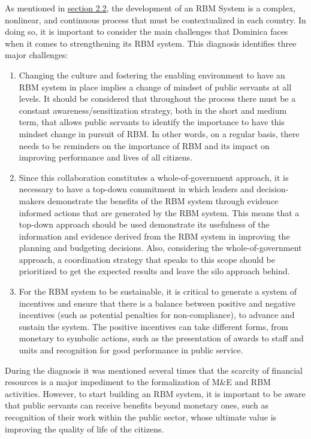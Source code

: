 \documentclass[
  10pt,
]{book}
\begin{document}
As mentioned in \protect\hyperlink{section2}{section 2.2}, the development of an RBM System is a complex, nonlinear, and continuous process that must be contextualized in each country. In doing so, it is important to consider the main challenges that Dominica faces when it comes to strengthening its RBM system. This diagnosis identifies three major challenges:

\begin{enumerate}
\def\labelenumi{\arabic{enumi}.}
\item
  Changing the culture and fostering the enabling environment to have an RBM system in place implies a change of mindset of public servants at all levels. It should be considered that throughout the process there must be a constant awareness/sensitization strategy, both in the short and medium term, that allows public servants to identify the importance to have this mindset change in pursuit of RBM. In other words, on a regular basis, there needs to be reminders on the importance of RBM and its impact on improving performance and lives of all citizens.
\item
  Since this collaboration constitutes a whole-of-government approach, it is necessary to have a top-down commitment in which leaders and decision-makers demonstrate the benefits of the RBM system through evidence informed actions that are generated by the RBM system. This means that a top-down approach should be used demonstrate its usefulness of the information and evidence derived from the RBM system in improving the planning and budgeting decisions. Also, considering the whole-of-government approach, a coordination strategy that speaks to this scope should be prioritized to get the expected results and leave the silo approach behind.
\item
  For the RBM system to be sustainable, it is critical to generate a system of incentives and ensure that there is a balance between positive and negative incentives (such as potential penalties for non-compliance), to advance and sustain the system. The positive incentives can take different forms, from monetary to symbolic actions, such as the presentation of awards to staff and units and recognition for good performance in public service.
\end{enumerate}

During the diagnosis it was mentioned several times that the scarcity of financial resources is a major impediment to the formalization of M\&E and RBM activities. However, to start building an RBM system, it is important to be aware that public servants can receive benefits beyond monetary ones, such as recognition of their work within the public sector, whose ultimate value is improving the quality of life of the citizens.
\end{document}
